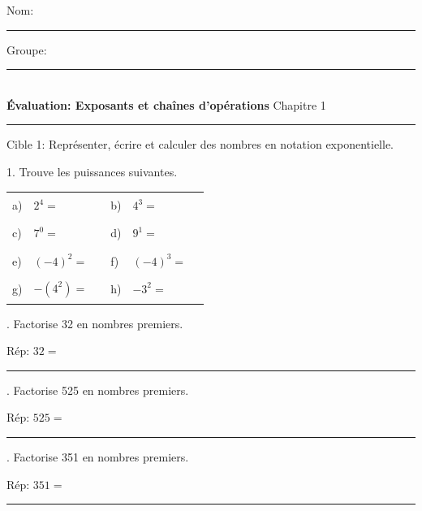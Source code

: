 \documentclass[11pt]{article}
\newcommand{\entete}{%
  \noindent Nom: \rule{6.5cm}{0.4pt} \hfill Groupe: \rule{3cm}{0.4pt}\\[4mm]
}
\begin{document}
\entete
\noindent \textbf{Évaluation: Exposants et chaînes d'opérations} \hfill Chapitre 1
\vspace{2mm}
\hrule
\vspace{4mm}

\begin{cible}{Cible 1: Représenter, écrire et calculer des nombres en notation exponentielle.}

1. Trouve les puissances suivantes.
\vspace{2mm}

\begin{tabular}{@{}p{0.5cm}p{2.3cm}p{4.3cm}p{0.5cm}p{2.3cm}p{4.3cm}@{}}
a) & $2^4 = $ & \rule{3.2cm}{0.4pt} & b) & $4^3 = $ & \rule{3.2cm}{0.4pt} \\[4mm]
c) & $7^0 = $ & \rule{3.2cm}{0.4pt} & d) & $9^1 = $ & \rule{3.2cm}{0.4pt} \\[4mm]
e) & $(-4)^2 = $ & \rule{3.2cm}{0.4pt} & f) & $(-4)^3 = $ & \rule{3.2cm}{0.4pt} \\[4mm]
g) & $-(4^2) = $ & \rule{3.2cm}{0.4pt} & h) & $-3^2 = $ & \rule{3.2cm}{0.4pt} \\
\end{tabular}

\vspace{6mm}
. Factorise 32 en nombres premiers.

\vspace{2.5cm}

\noindent Rép: $32 = $ \rule{3.5cm}{0.4pt}


\vspace{6mm}
. Factorise 525 en nombres premiers.

\vspace{2.5cm}

\noindent Rép: $525 = $ \rule{3.5cm}{0.4pt}

\vspace{6mm}

. Factorise 351 en nombres premiers.

\vspace{2.5cm}

\noindent Rép: $351 = $ \rule{3.5cm}{0.4pt}
\vspace{4mm}
\end{cible}


\newpage

\end{document}
